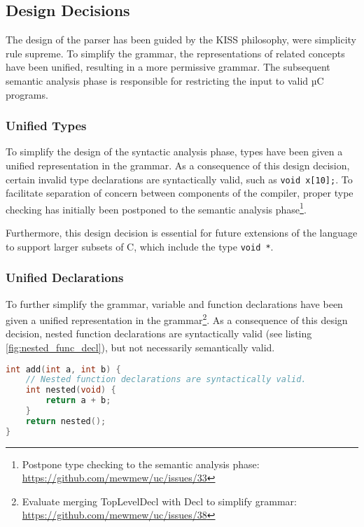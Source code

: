 \subsection{Design Decisions}

The design of the parser has been guided by the KISS philosophy, were simplicity rule supreme. To simplify the grammar, the representations of related concepts have been unified, resulting in a more permissive grammar. The subsequent semantic analysis phase is responsible for restricting the input to valid µC programs.

\subsubsection{Unified Types}

To simplify the design of the syntactic analysis phase, types have been given a unified representation in the grammar. As a consequence of this design decision, certain invalid type declarations are syntactically valid, such as \texttt{void x[10];}. To facilitate separation of concern between components of the compiler, proper type checking has initially been postponed to the semantic analysis phase\footnote{Postpone type checking to the semantic analysis phase: \url{https://github.com/mewmew/uc/issues/33}}.

Furthermore, this design decision is essential for future extensions of the language to support larger subsets of C, which include the type \texttt{void *}.

\subsubsection{Unified Declarations}

To further simplify the grammar, variable and function declarations have been given a unified representation in the grammar\footnote{Evaluate merging TopLevelDecl with Decl to simplify grammar: \url{https://github.com/mewmew/uc/issues/38}}. As a consequence of this design decision, nested function declarations are syntactically valid (see listing \ref{fig:nested_func_decl}), but not necessarily semantically valid.

\begin{lstlisting}[language=C,style=c,caption={\label{fig:nested_func_decl}Nested function declarations.}]
int add(int a, int b) {
	// Nested function declarations are syntactically valid.
	int nested(void) {
		return a + b;
	}
	return nested();
}
\end{lstlisting}

